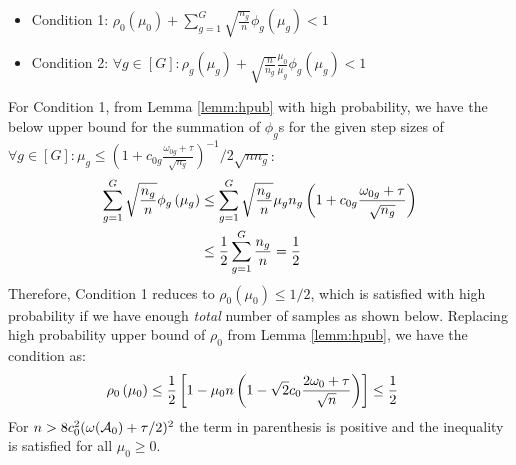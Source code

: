 	\begin{itemize}
		\item Condition 1: $\rho_0\left(\mu_0\right) + \sum_{g=1}^{G} \sqrt{\frac{n_g}{n}} \phi_g\left(\mu_g\right) < 1$
		\item Condition 2: $\forall g \in [G]: \rho_g\left(\mu_g\right) + \sqrt{\frac{n}{n_g}} \frac{\mu_0}{\mu_g}\phi_g\left(\mu_g\right) < 1$
	\end{itemize}	
	For Condition 1, from Lemma \ref{lemm:hpub} with high probability, we have the below upper bound for the summation of $\phi_g$s for the given step sizes of $\forall g \in [G]: \mu_g \leq \left(1 + c_{0g}\frac{\omega_{0g} + \tau}{\sqrt{n_g}} \right)^{-1}/2\sqrt{n n_g}$:
	\begin{align}	 
	\nonumber 
	\sum_{g=1}^{G} \sqrt{\frac{n_g}{n}} \phi_g\left(\mu_g\right) 
	&\leq \sum_{g=1}^{G} \sqrt{\frac{n_g}{n}} \mu_g n_g \left(1 + c_{0g}\frac{\omega_{0g} + \tau}{\sqrt{n_g}} \right)
	\\ \nonumber 
	&\leq \frac{1}{2} \sum_{g=1}^{G} \frac{n_g}{n} = \frac{1}{2}
	\end{align}
	Therefore, Condition 1 reduces to $\rho_0\left(\mu_0\right) \leq 1/2$, which is satisfied with high probability if we have enough \textit{total} number of samples as shown below. Replacing high probability upper bound of $\rho_0$ from Lemma \ref{lemm:hpub}, we have the condition as:	
	\begin{align}	 
	\nonumber 
	\rho_0\left(\mu_0\right)
	&\leq  \frac{1}{2} \left[1 - \mu_0 n \left(1 - \sqrt{2} c_0\frac{2 \omega_0 + \tau}{ \sqrt{n}} \right)\right] \leq \frac{1}{2}
	\end{align}
	For $n > 8 c_0^2 (\omega(\cA_0) + \tau/2)^2$ the term in parenthesis is positive and the inequality is satisfied for all $\mu_0 \geq 0$. 
		

